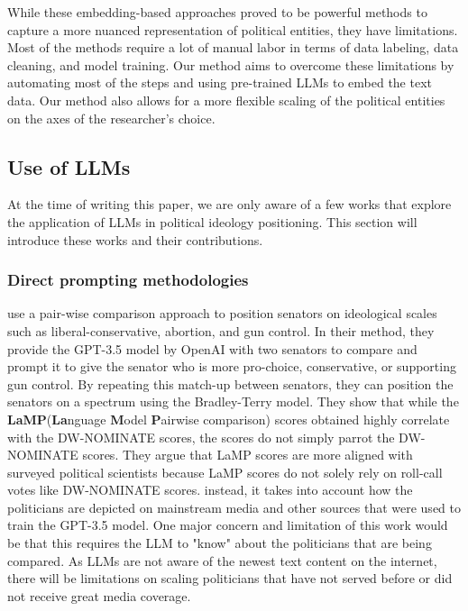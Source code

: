 \documentclass[final,5p,times,twocolumn,authoryear]{elsarticle}
\begin{document}
While these embedding-based approaches proved to be powerful methods to capture a more nuanced representation of political entities, they have limitations. Most of the methods require a lot of manual labor in terms of data labeling, data cleaning, and model training. Our method aims to overcome these limitations by automating most of the steps and using pre-trained LLMs to embed the text data. Our method also allows for a more flexible scaling of the political entities on the axes of the researcher's choice.

\subsection{Use of LLMs}
At the time of writing this paper, we are only aware of a few works that explore the application of LLMs in political ideology positioning. This section will introduce these works and their contributions. 
\subsubsection{Direct prompting methodologies}
\citeauthor{llm-latent-position-of-politicians} use a pair-wise comparison approach to position senators on ideological scales such as liberal-conservative, abortion, and gun control. In their method, they provide the GPT-3.5 model by OpenAI with two senators to compare and prompt it to give the senator who is more pro-choice, conservative, or supporting gun control. By repeating this match-up between senators, they can position the senators on a spectrum using the Bradley-Terry model. They show that while the \textbf{LaMP}(\textbf{La}nguage \textbf{M}odel \textbf{P}airwise comparison) scores obtained highly correlate with the DW-NOMINATE scores, the scores do not simply parrot the DW-NOMINATE scores. They argue that LaMP scores are more aligned with surveyed political scientists because LaMP scores do not solely rely on roll-call votes like DW-NOMINATE scores. instead, it takes into account how the politicians are depicted on mainstream media and other sources that were used to train the GPT-3.5 model. One major concern and limitation of this work would be that this requires the LLM to "know" about the politicians that are being compared. As LLMs are not aware of the newest text content on the internet, there will be limitations on scaling politicians that have not served before or did not receive great media coverage.
\end{document}
